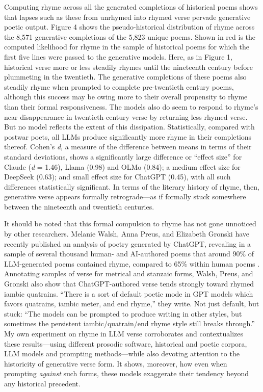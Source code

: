 \documentclass{simple-humanities}         %
\begin{document}
Computing rhyme across all the generated completions of historical poems shows that lapses such as these from unrhymed into rhymed verse pervade generative poetic output.
Figure 4 shows the pseudo-historical distribution of rhyme across the 8,571 generative completions of the 5,823 unique poems.
Shown in red is the computed likelihood for rhyme in the sample of historical poems for which the first five lines were passed to the generative models.
Here, as in Figure 1, historical verse more or less steadily rhymes until the nineteenth century before plummeting in the twentieth.
The generative completions of these poems also steadily rhyme when prompted to complete pre-twentieth century poems, although this success may be owing more to their overall propensity to rhyme than their formal responsiveness.
The models also do seem to respond to rhyme's near disappearance in twentieth-century verse by returning less rhymed verse.
But no model reflects the extent of this dissipation.
Statistically, compared with postwar poets, all LLMs produce significantly more rhyme in their completions thereof.
Cohen's \emph{d}, a measure of the difference between means in terms of their standard deviations, shows a significantly large difference or ``effect size'' for Claude (\emph{d} = 1.46), Llama (0.98) and OLMo (0.84); a medium effect size for DeepSeek (0.63); and small effect size for ChatGPT (0.45), with all such differences statistically significant.
In terms of the literary history of rhyme, then, generative verse appears formally retrograde---as if formally stuck somewhere between the nineteenth and twentieth centuries.

It should be noted that this formal compulsion to rhyme has not gone unnoticed by other researchers. Melanie Walsh, Anna Preus, and Elizabeth Gronski have recently published an analysis of poetry generated by ChatGPT, revealing in a sample of several thousand human- and AI-authored poems that around 90\% of LLM-generated poems contained rhyme, compared to 65\% within human poems \parencite{walshDoesChatGPTHave2024}.
Annotating samples of verse for metrical and stanzaic forms, Walsh, Preus, and Gronski also show that ChatGPT-authored verse tends strongly toward rhymed iambic quatrains. 
``There is a sort of default poetic mode in GPT models which favors quatrains, iambic meter, and end rhyme,'' they write. Not just default, but stuck: ``The models can be prompted to produce writing in other styles, but sometimes the persistent iambic/quatrain/end rhyme style still breaks through.'' 
My own experiment on rhyme in LLM verse corroborates and contextualizes these results---using different prosodic software, historical and poetic corpora, LLM models and prompting methods---while also devoting attention to the historicity of generative verse form.
It shows, moreover, how even when prompting \emph{against} such forms, these models exaggerate their tendency beyond any historical precedent.
\end{document}
